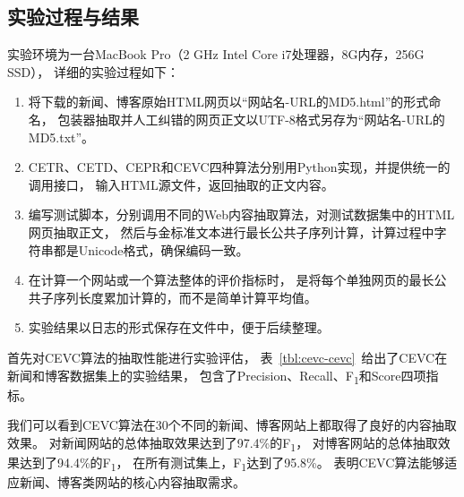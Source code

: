 \subsection{实验过程与结果}

实验环境为一台MacBook Pro（2 GHz Intel Core i7处理器，8G内存，256G SSD），
详细的实验过程如下：
\begin{enumerate}
\item 将下载的新闻、博客原始HTML网页以“网站名-URL的MD5.html”的形式命名，
包装器抽取并人工纠错的网页正文以UTF-8格式另存为“网站名-URL的MD5.txt”。
\item CETR、CETD、CEPR和CEVC四种算法分别用Python实现，并提供统一的调用接口，
输入HTML源文件，返回抽取的正文内容。
\item 编写测试脚本，分别调用不同的Web内容抽取算法，对测试数据集中的HTML网页抽取正文，
然后与金标准文本进行最长公共子序列计算，计算过程中字符串都是Unicode格式，确保编码一致。
\item 在计算一个网站或一个算法整体的评价指标时，
是将每个单独网页的最长公共子序列长度累加计算的，而不是简单计算平均值。
\item 实验结果以日志的形式保存在文件中，便于后续整理。
\end{enumerate}

首先对CEVC算法的抽取性能进行实验评估，
表~\ref{tbl:cevc-cevc}~给出了CEVC在新闻和博客数据集上的实验结果，
包含了Precision、Recall、F\textsubscript{1}和Score四项指标。

我们可以看到CEVC算法在30个不同的新闻、博客网站上都取得了良好的内容抽取效果。
对新闻网站的总体抽取效果达到了97.4\%的F\textsubscript{1}，
对博客网站的总体抽取效果达到了94.4\%的F\textsubscript{1}，
在所有测试集上，F\textsubscript{1}达到了95.8\%。
表明CEVC算法能够适应新闻、博客类网站的核心内容抽取需求。

